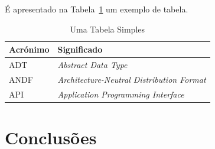 \documentclass[twocolumn,twoside,11pt]{article}
\begin{document}
É apresentado na Tabela~\ref{tab:exemplo1} um exemplo de tabela.

\begin{table}[H]
  \centering
  \caption{Uma Tabela Simples}
  \begin{tabular}{| l | p{45mm} |}
    \hline
    \textbf{Acrónimo} & \textbf{Significado}\\
    \hline
    \hline
    ADT   & \emph{Abstract Data Type}\\\hline
    ANDF  & \emph{Architecture-Neutral Distribution Format}\\\hline
    API   & \emph{Application Programming Interface}\\
    \hline
  \end{tabular}
  \label{tab:exemplo1}
\end{table}

\lipsum[7]



\section{Conclusões}\label{sec:conclusions}
\end{document}
